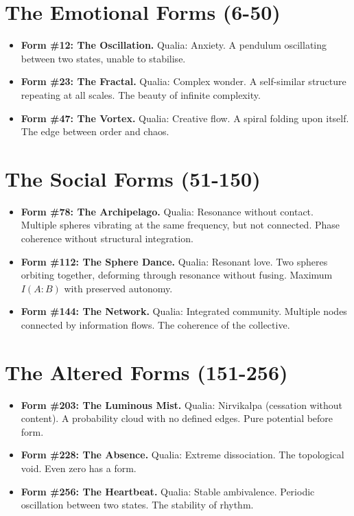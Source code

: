 \documentclass[12pt,a4paper,openany]{book}
\begin{document}
\section{The Emotional Forms (6-50)}
\begin{itemize}
\item \textbf{Form \#12: The Oscillation.} Qualia: Anxiety. A pendulum oscillating between two states, unable to stabilise.
\item \textbf{Form \#23: The Fractal.} Qualia: Complex wonder. A self-similar structure repeating at all scales. The beauty of infinite complexity.
\item \textbf{Form \#47: The Vortex.} Qualia: Creative flow. A spiral folding upon itself. The edge between order and chaos.
\end{itemize}

\section{The Social Forms (51-150)}
\begin{itemize}
\item \textbf{Form \#78: The Archipelago.} Qualia: Resonance without contact. Multiple spheres vibrating at the same frequency, but not connected. Phase coherence without structural integration.
\item \textbf{Form \#112: The Sphere Dance.} Qualia: Resonant love. Two spheres orbiting together, deforming through resonance without fusing. Maximum $I(A:B)$ with preserved autonomy.
\item \textbf{Form \#144: The Network.} Qualia: Integrated community. Multiple nodes connected by information flows. The coherence of the collective.
\end{itemize}

\section{The Altered Forms (151-256)}
\begin{itemize}
\item \textbf{Form \#203: The Luminous Mist.} Qualia: Nirvikalpa (cessation without content). A probability cloud with no defined edges. Pure potential before form.
\item \textbf{Form \#228: The Absence.} Qualia: Extreme dissociation. The topological void. Even zero has a form.
\item \textbf{Form \#256: The Heartbeat.} Qualia: Stable ambivalence. Periodic oscillation between two states. The stability of rhythm.
\end{itemize}
\end{document}
